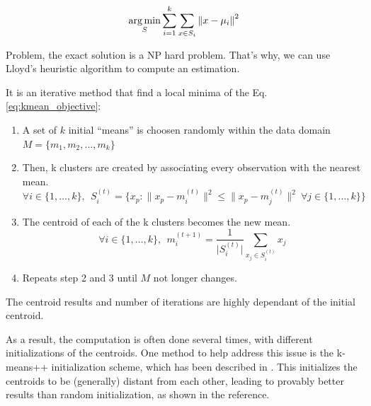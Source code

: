 \begin{equation} \label{eq:kmean_objective}
    \underset {S}{\operatorname {arg\,min}} \sum _{i=1}^{k} \sum _{x \in S_{i}} \left\| x - \mu_{i} \right\|^{2}
\end{equation}

Problem, the exact solution is a NP hard problem. That's why, we can use Lloyd's heuristic algorithm to compute an estimation.

It is an iterative method that find a local minima of the Eq. \ref{eq:kmean_objective}:

\begin{enumerate}
    \item A set of $k$ initial \enquote{means} is choosen randomly within the data domain $M = \{m_1, m_2, \ldots, m_k \}$
    
    \item Then, k clusters are created by associating every observation with the nearest mean.
    $$ \forall i \in \{ 1, \ldots, k \}, ~~ S_{i}^{(t)}= \big \{ x_{p}:{\big \|}x_{p}-m_{i}^{(t)}{\big \|}^{2}\leq {\big \|}x_{p}-m_{j}^{(t)}{\big \|}^{2} ~ \forall j \in \{ 1, \ldots, k \} \big \}$$
    
    \item The centroid of each of the k clusters becomes the new mean.
    $$ \forall i \in \{ 1, \ldots, k \}, ~~ m_{i}^{(t+1)}=\frac {1}{\lvert S_{i}^{(t)} \rvert } \sum _{x_{j} \in S_{i}^{(t)}} x_{j} $$
    
    \item Repeats step 2 and 3 until $M$ not longer changes.
\end{enumerate}

The centroid results and number of iterations are highly dependant of the initial centroid.

As a result, the computation is often done several times, with different initializations of the centroids. One method to help address this issue is the k-means++ initialization scheme, which has been described in \cite{Arthur2007}. This initializes the centroids to be (generally) distant from each other, leading to provably better results than random initialization, as shown in the reference.
